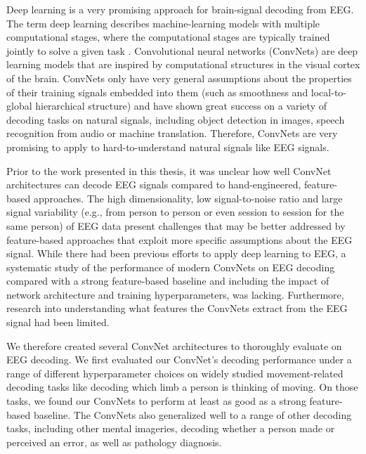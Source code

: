 Deep learning is a very promising approach for brain-signal decoding
from EEG. The term deep learning describes machine-learning models with
multiple computational stages, where the computational stages are
typically trained jointly to solve a given task
\citep{lecun_deep_2015,schmidhuber_deep_2015}.
Convolutional neural networks (ConvNets) are deep learning models that
are inspired by computational structures in the visual cortex of the
brain. ConvNets only have very
general assumptions about the properties of their training signals
embedded into them (such as smoothness and local-to-global hierarchical
structure) and have shown great success on a variety of  decoding tasks 
on natural signals, including object detection in images, speech recognition from audio or machine translation.
Therefore, ConvNets are very promising to apply to hard-to-understand
natural signals like EEG signals.

    Prior to the work presented in this thesis, it was unclear how well
ConvNet architectures can decode EEG signals compared to
hand-engineered, feature-based approaches. The high dimensionality, low
signal-to-noise ratio and large signal variability (e.g., from person to
person or even session to session for the same person) of EEG data
present challenges that may be better addressed by feature-based
approaches that exploit more specific assumptions about the EEG signal.
While there had been previous efforts to apply deep learning to EEG, a
systematic study of the performance of modern ConvNets on EEG decoding
compared with a strong feature-based baseline and including the impact
of network architecture and training hyperparameters, was lacking.
Furthermore, research into understanding what features the ConvNets
extract from the EEG signal had been limited.

    We therefore created several ConvNet architectures to thoroughly
evaluate on EEG decoding. We first evaluated our ConvNet's decoding
performance under a range of different hyperparameter choices on widely
studied movement-related decoding tasks like decoding which limb a
person is thinking of moving. On those tasks, we found our ConvNets to
perform at least as good as a strong feature-based baseline. The
ConvNets also generalized well to a range of other decoding tasks,
including other mental imageries, decoding whether a person made or
perceived an error, as well as pathology diagnosis.


